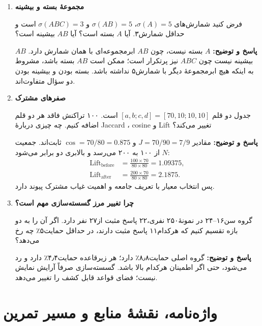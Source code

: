 \documentclass[12pt,a4paper,oneside]{report}
\newcounter{ex}[chapter]
\newenvironment{selftests}{\begin{enumerate}\setlength{\itemsep}{9pt}}{\end{enumerate}}
\newenvironment{selftest}[1]{\item\textbf{#1}\par}{\par}
\newcommand{\answer}[1]{\par{\color{teal}\bfseries پاسخ و توضیح: }#1\par}
\begin{document}
\begin{selftests}
\begin{selftest}{مجموعهٔ بسته و بیشینه}
فرض کنید شمارش‌های $\sigma(A)=5$، $\sigma(AB)=5$ و $\sigma(ABC)=3$ است و حداقل شمارش۳. آیا $A$ بسته است؟ آیا $AB$ بیشینه است؟
\answer{$A$ بسته نیست، چون $AB$ ابرمجموعه‌ای با همان شمارش دارد. $AB$ بیشینه نیست چون $ABC$ نیز پرتکرار است؛ ممکن است $AB$ بسته باشد، مشروط به اینکه هیچ ابرمجموعهٔ دیگر با شمارش۵ نداشته باشد. بسته بودن و بیشینه بودن دو سؤال متفاوت‌اند.}
\end{selftest}

\begin{selftest}{صفرهای مشترک}
جدول دو قلم $[a,b;c,d]=[70,10;10,10]$ است. ۱۰۰ تراکنش فاقد هر دو قلم اضافه کنیم. چه چیزی دربارهٔ Jaccard ، cosine و Lift تغییر می‌کند؟
\answer{مقادیر $J=70/90=7/9$ و $\operatorname{cos}=70/80=0.875$ ثابت‌اند. جمعیت $N$ از ۱۰۰ به ۲۰۰ می‌رسد و بالابری دو برابر می‌شود:
\begin{align*}
\operatorname{Lift}_{\mathrm{before}}&=\frac{100\times70}{80\times80}=1.09375,\\
\operatorname{Lift}_{\mathrm{after}}&=\frac{200\times70}{80\times80}=2.1875.
\end{align*}
پس انتخاب معیار با تعریف جامعه و اهمیت غیاب مشترک پیوند دارد.}
\end{selftest}

\begin{selftest}{چرا تغییر مرز گسسته‌سازی مهم است؟}
گروه سن۱۶--۲۴ در نمونهٔ۲۵۰ نفری،۲۲ پاسخ مثبت از۲۷ نفر دارد. اگر آن را به دو بازه تقسیم کنیم که هرکدام۱۱ پاسخ مثبت دارند، در حداقل حمایت۵٪ چه رخ می‌دهد؟
\answer{گروه اصلی حمایت۸٫۸٪ دارد؛ هر زیرقاعده حمایت۴٫۴٪ دارد و رد می‌شود، حتی اگر اطمینان هرکدام بالا باشد. گسسته‌سازی صرفاً آرایش نمایش نیست؛ فضای قواعد قابل کشف را تغییر می‌دهد.}
\end{selftest}
\end{selftests}

\appendix
\chapter{واژه‌نامه، نقشهٔ منابع و مسیر تمرین}
\end{document}
